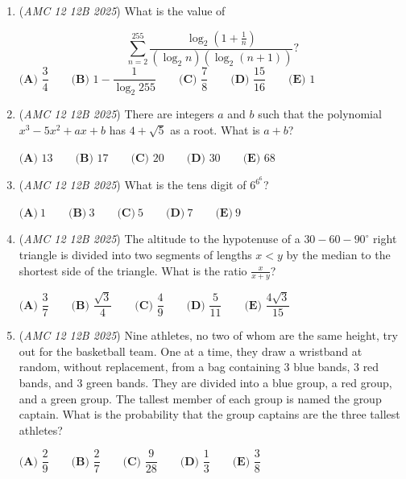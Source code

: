 \begin{enumerate}
 $\textbf{(A) } 7 \qquad\textbf{(B) } 8 \qquad\textbf{(C) } 11 \qquad\textbf{(D) } 14 \qquad\textbf{(E) } 15$


	\item (\textit{AMC 12 12B 2025}) What is the value of 


 
 \[\sum_{n=2}^{255} \frac{\log_2(1+\frac{1}{n})}{(\log_2 n)(\log_2(n+1))}?\]
$\textbf{(A) } \dfrac{3}{4} \qquad\textbf{(B) } 1-\dfrac{1}{\log_2 255} \qquad\textbf{(C) } \dfrac{7}{8} \qquad\textbf{(D) } \dfrac{15}{16} \qquad\textbf{(E) } 1$


	\item (\textit{AMC 12 12B 2025}) There are integers $a$ and $b$ such that the polynomial $x^3 - 5x^2 + ax + b$ has $4+\sqrt{5}$ as a root. What is $a+b$?


 $\textbf{(A) } 13 \qquad \textbf{(B) } 17 \qquad \textbf{(C) } 20 \qquad \textbf{(D) } 30 \qquad \textbf{(E) } 68$


	\item (\textit{AMC 12 12B 2025}) What is the tens digit of $6^{6^6}$?


 $\textbf{(A)}~1 \qquad \textbf{(B)}~3 \qquad \textbf{(C)}~5 \qquad \textbf{(D)}~7 \qquad \textbf{(E)}~9$


	\item (\textit{AMC 12 12B 2025}) The altitude to the hypotenuse of a $30{-}60{-}90^\circ$ right triangle is divided into two segments of lengths $x<y$ by the median to the shortest side of the triangle. What is the ratio $\frac{x}{x+y}$?


 $\textbf{(A) } \dfrac{3}{7} \qquad \textbf{(B) } \dfrac{\sqrt3}{4} \qquad \textbf{(C) } \dfrac{4}{9} \qquad \textbf{(D) } \dfrac{5}{11}  \qquad \textbf{(E) } \dfrac{4\sqrt3}{15}$


	\item (\textit{AMC 12 12B 2025}) Nine athletes, no two of whom are the same height, try out for the basketball team. One at a time, they draw a wristband at random, without replacement, from a bag containing $3$ blue bands, $3$ red bands, and $3$ green bands. They are divided into a blue group, a red group, and a green group. The tallest member of each group is named the group captain. What is the probability that the group captains are the three tallest athletes?


 $\textbf{(A) } \dfrac{2}{9} \qquad \textbf{(B) } \dfrac{2}{7} \qquad \textbf{(C) } \dfrac{9}{28} \qquad \textbf{(D) } \dfrac{1}{3}  \qquad \textbf{(E) } \dfrac{3}{8}$



\end{enumerate}
